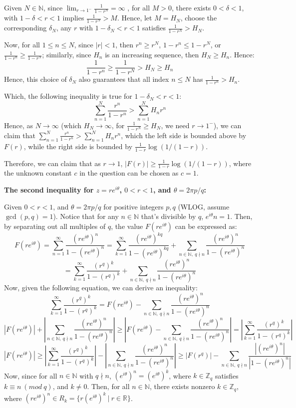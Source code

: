 \documentclass{article}
\begin{document}
Given $N\in\mathbb{N}$, since $\lim_{r\rightarrow 1^-}\frac{1}{1-r^N}=\infty$ , for all $M>0$, there exists $0<\delta<1$, with $1-\delta<r<1$ implies $\frac{1}{1-r^N}>M$. Hence, let $M=H_N$, choose the corresponding $\delta_N$,
any $r$ with $1-\delta_N<r<1$ satisfies $\frac{1}{1-r^N}>H_N$.

Now, for all $1\leq n\leq N$, since $|r|<1$, then $r^n\geq r^N$, $1-r^n\leq 1-r^N$, or $\frac{1}{1-r^n}\geq \frac{1}{1-r^N}$; similarly, since $H_n$ is an increasing sequence, then $H_N\geq H_n$. Hence:
$$\frac{1}{1-r^n}\geq \frac{1}{1-r^N}>H_N\geq H_n$$
Hence, this choice of $\delta_N$ also guarantees that all index $n\leq N$ has $\frac{1}{1-r^n}>H_n$.

Which, the following inequality is true for $1-\delta_N<r<1$:
$$\sum_{n=1}^{N}\frac{r^n}{1-r^n}>\sum_{n=1}^{N}H_nr^n$$
Hence, as $N\rightarrow\infty$ (which $H_N\rightarrow\infty$, for $\frac{1}{1-r^N}\geq H_N$, we need $r\rightarrow 1^-$), we can claim that $\sum_{n=1}^{N}\frac{r^n}{1-r^n}>\sum_{n=1}^{N}H_nr^n$, which the left side is bounded above by $F(r)$, while the right side is bounded by $\frac{1}{1-r}\log(1/(1-r))$.

Therefore, we can claim that as $r\rightarrow 1$, $|F(r)|\geq \frac{1}{1-r}\log(1/(1-r))$, where the unknown constant $c$ in the question can be chosen as $c=1$.

\hfil

\textbf{The second inequality for $z=re^{i\theta}$, $0<r<1$, and $\theta=2\pi p/q$:}

Given $0<r<1$, and $\theta=2\pi p/q$ for positive integers $p,q$ (WLOG, assume $\gcd(p,q)=1$). 
Notice that for any $n\in\mathbb{N}$ that's divisible by $q$, $e^{i\theta}n = 1$. Then, by separating out all multiples of $q$, the value $F(re^{i\theta})$ can be expressed as:
$$F(re^{i\theta})=\sum_{n=1}^{\infty}\frac{(re^{i\theta})^n}{1-(re^{i\theta})^n}=\sum_{k=1}^{\infty}\frac{(re^{i\theta})^{kq}}{1-(re^{i\theta})^{kq}}+\sum_{n\in\mathbb{N},\ q\nmid n}\frac{(re^{i\theta})^n}{1-(re^{i\theta})^n}$$
$$= \sum_{k=1}^{\infty}\frac{(r^q)^k}{1-(r^q)^k}+\sum_{n\in\mathbb{N},\ q\nmid n}\frac{(re^{i\theta})^n}{1-(re^{i\theta})^n}$$
Now, given the following equation, we can derive an inequality:
$$\sum_{k=1}^{\infty}\frac{(r^q)^k}{1-(r^q)^k}=F(re^{i\theta})-\sum_{n\in\mathbb{N},\ q\nmid n}\frac{(re^{i\theta})^n}{1-(re^{i\theta})^n}$$
$$\left|
F(re^{i\theta})
\right|+\left|
\sum_{n\in\mathbb{N},\ q\nmid n}\frac{(re^{i\theta})^n}{1-(re^{i\theta})^n}
\right|\geq \left|
F(re^{i\theta})-\sum_{n\in\mathbb{N},\ q\nmid n}\frac{(re^{i\theta})^n}{1-(re^{i\theta})^n}
\right|=\left|
\sum_{k=1}^{\infty}\frac{(r^q)^k}{1-(r^q)^k}
\right|$$
$$\left|
F(re^{i\theta})
\right|\geq \left|
\sum_{k=1}^{\infty}\frac{(r^q)^k}{1-(r^q)^k}
\right|-\left|
\sum_{n\in\mathbb{N},\ q\nmid n}\frac{(re^{i\theta})^n}{1-(re^{i\theta})^n}
\right|\geq |F(r^q)|-\sum_{n\in\mathbb{N},\ q\nmid n}\frac{|(re^{i\theta})^n|}{|1-(re^{i\theta})^n|}$$
Now, since for all $n\in\mathbb{N}$ with $q\nmid n$, $(e^{i\theta})^n=(e^{i\theta})^k$, where $k\in \mathbb{Z}_q$ satisfies $k\equiv n\ (mod\ q)$, and $k\neq 0$.
Then, for all $n\in\mathbb{N}$, there exists nonzero $k\in\mathbb{Z}_q$, where $(re^{i\theta})^n\in R_k=\{r(e^{i\theta})^k\ |\ r\in\mathbb{R}\}$.
\end{document}
